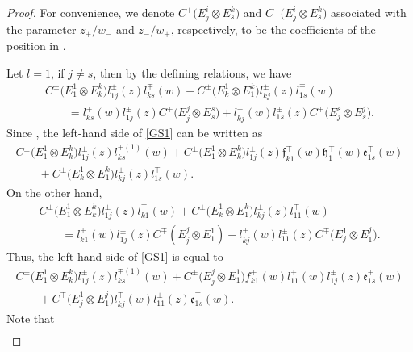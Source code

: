 \documentclass[10pt,a4paper]{amsart}
\numberwithin{equation}{section}
\begin{document}
\begin{proof}





For convenience, we denote $C^+\bigl(E^i_j\otimes E^k_s\bigr)$ and $C^-\bigl(E^i_j\otimes E^k_s\bigr)$ associated with the parameter $z_+/w_-$ and $z_-/w_+$, respectively, to be the coefficients of the position  in .

Let $l=1$, if $j\neq s$, then by the defining relations, we have
\begin{gather}
 C^{\pm}\bigl(E^1_1\otimes E^k_k\bigr)l_{1j}^{\pm}(z)l_{ks}^{\mp}(w)+ C^{\pm}\bigl(E^1_k\otimes E^k_1\bigr)l_{kj}^{\pm}(z)l_{1s}^{\mp}(w) \nonumber\\ \qquad =l_{ks}^{\mp}(w)l_{1j}^{\pm}(z)C^{\mp}\bigl(E^j_j\otimes E^s_s\bigr)+l_{kj}^{\mp}(w)l_{1s}^{\pm}(z)C^{\mp}\bigl(E^s_j\otimes E^j_s\bigr).\label{GS1}
\end{gather}
Since , the left-hand side of \eqref{GS1} can be written as
\begin{gather*}
 C^{\pm}\bigl(E^1_1\otimes E^k_k\bigr)l_{1j}^{\pm}(z)l_{ks}^{\mp(1)}(w)+ C^{\pm}\bigl(E^1_1\otimes E^k_k\bigr)l_{1j}^{\pm}(z)\mathfrak{f}_{k1}^{\mp}(w)\mathfrak{h}_{1}^{\mp}(w)\mathfrak{e}_{1s}^{\mp}(w)\nonumber\\
 \qquad{}+ C^{\pm}\bigl(E^1_k\otimes E^k_1\bigr)l_{kj}^{\pm}(z)l_{1s}^{\mp}(w).
\end{gather*}On the other hand,
\begin{gather*}
 C^{\pm}\bigl(E^1_1\otimes E^k_k\bigr)l_{1j}^{\pm}(z)l_{k1}^{\mp}(w)+ C^{\pm}\bigl(E^1_k\otimes E^k_1\bigr)l_{kj}^{\pm}(z)l_{11}^{\mp}(w)\nonumber\\
\qquad = l_{k1}^{\mp}(w)l_{1j}^{\pm}(z)C^{\mp}(E^j_j\otimes E^1_1)+l_{kj}^{\mp}(w)l_{11}^{\pm}(z)C^{\mp}\bigl(E^1_j\otimes E^j_1\bigr).
\end{gather*}
Thus, the left-hand side of \eqref{GS1} is equal to
\begin{gather*}
 C^{\pm}\bigl(E^1_1\otimes E^k_k\bigr)l_{1j}^{\pm}(z)l_{ks}^{\mp(1)}(w)+ C^{\pm}\bigl(E^j_j\otimes E^1_1\bigr)f_{k1}^{\mp}(w)l_{11}^{\mp}(w)l_{1j}^{\pm}(z)\mathfrak{e}_{1s}^{\mp}(w)\\
 \qquad{}+
 C^{\mp}\bigl(E^1_j\otimes E^j_1\bigr)l_{kj}^{\mp}(w)l_{11}^{\pm}(z)\mathfrak{e}_{1s}^{\mp}(w).
\end{gather*}Note that
\begin{gather*}

\end{gather*}
\end{proof}
\end{document}
